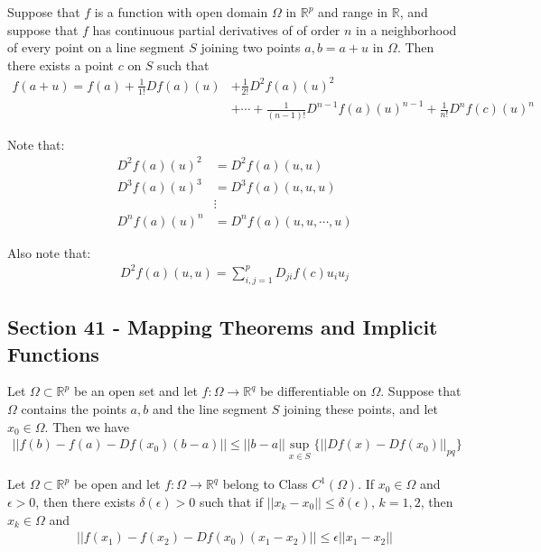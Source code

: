 \documentclass[12pt]{article}
\newcommand{\R}{\mathbb{R}}
\newenvironment{theorem}[2][Theorem]{\begin{trivlist}
\item[\hskip \labelsep {\bfseries #1}\hskip \labelsep {\bfseries #2.}]}{\end{trivlist}}
\newenvironment{lemma}[2][Lemma]{\begin{trivlist}
\item[\hskip \labelsep {\bfseries #1}\hskip \labelsep {\bfseries #2.}]}{\end{trivlist}}
\begin{document}
\begin{theorem}[Taylor's]{Theorem 40.9}
Suppose that $f$ is a function with open domain $\Omega$ in $\R^p$ and range in $\R$, and suppose that $f$ has continuous partial derivatives of of order $n$ in a neighborhood of every point on a line segment $S$ joining two points $a, b = a + u$ in $\Omega$. Then there exists a point $c$ on $S$ such that
\begin{align*}
f(a + u) = f(a) + \frac{1}{1!}Df(a)(u) &+ \frac{1}{2!}D^2f(a)(u)^2 \\
&+ \cdots + \frac{1}{(n-1)!}D^{n-1}f(a)(u)^{n-1} + \frac{1}{n!}D^nf(c)(u)^n
\end{align*}

Note that:
\begin{align*}
D^2f(a)(u)^2 &= D^2f(a)(u, u)\\
D^3f(a)(u)^3 &= D^3f(a)(u, u, u)\\
&\vdots\\
D^nf(a)(u)^n &= D^nf(a)(u, u, \cdots, u)
\end{align*}

Also note that:
\begin{align*}
D^2f(a)(u, u) = \sum_{i, j = 1}^p D_{ji}f(c)u_iu_j
\end{align*}
\end{theorem}

\subsection*{Section 41 - Mapping Theorems and Implicit Functions}

\begin{lemma}{41.3}
Let $\Omega \subset \R^p$ be an open set and let $f: \Omega \to \R^q$ be differentiable on $\Omega$. Suppose that $\Omega$ contains the points $a, b$ and the line segment $S$ joining these points, and let $x_0 \in \Omega$. Then we have
\begin{align*}
||f(b) - f(a) - Df(x_0)(b-a)|| \leq ||b-a|| \sup_{x \in S} \{||Df(x) - Df(x_0)||_{pq} \}
\end{align*}
\end{lemma}

\begin{lemma}[Approximation]{Lemma}
Let $\Omega \subset \R^p$ be open and let $f: \Omega \to \R^q$ belong to Class $C^1(\Omega)$. If $x_0 \in \Omega$ and $\epsilon > 0$, then there exists $\delta(\epsilon) > 0$ such that if $||x_k - x_0|| \leq \delta(\epsilon)$, $k = 1, 2$, then $x_k \in \Omega$ and
\begin{align*}
||f(x_1) - f(x_2) - Df(x_0)(x_1 - x_2)|| \leq \epsilon ||x_1 - x_2||
\end{align*}
\end{lemma}
\end{document}
